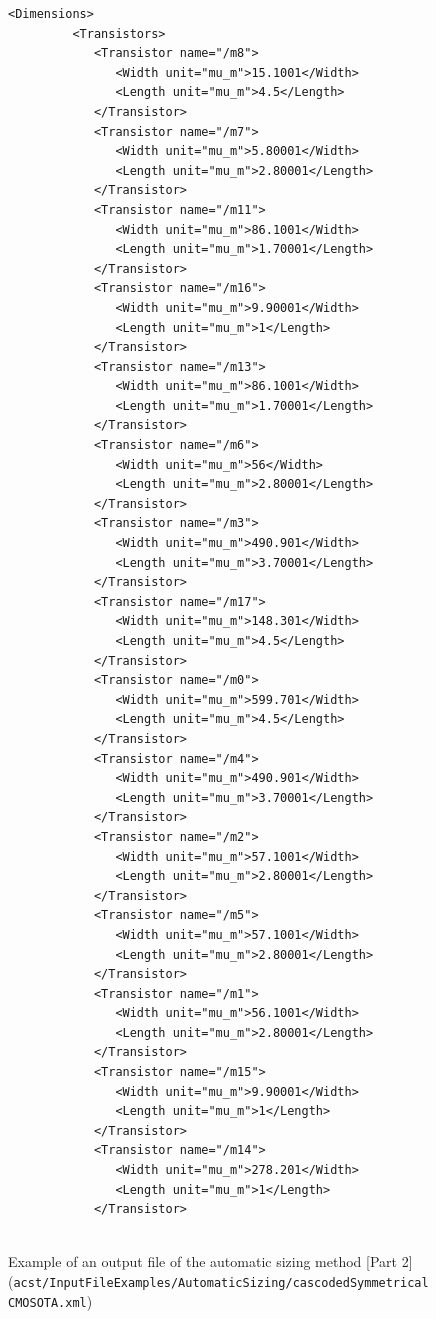 \begin{figure}[H]
	\begin{lstlisting}[basicstyle=\ttfamily\scriptsize,backgroundcolor={\color{gray!30}}, escapechar=? ]
      <Dimensions>
         <Transistors>
            <Transistor name="/m8">
               <Width unit="mu_m">15.1001</Width>
               <Length unit="mu_m">4.5</Length>
            </Transistor>
            <Transistor name="/m7">
               <Width unit="mu_m">5.80001</Width>
               <Length unit="mu_m">2.80001</Length>
            </Transistor>
            <Transistor name="/m11">
               <Width unit="mu_m">86.1001</Width>
               <Length unit="mu_m">1.70001</Length>
            </Transistor>
            <Transistor name="/m16">
               <Width unit="mu_m">9.90001</Width>
               <Length unit="mu_m">1</Length>
            </Transistor>
            <Transistor name="/m13">
               <Width unit="mu_m">86.1001</Width>
               <Length unit="mu_m">1.70001</Length>
            </Transistor>
            <Transistor name="/m6">
               <Width unit="mu_m">56</Width>
               <Length unit="mu_m">2.80001</Length>
            </Transistor>
            <Transistor name="/m3">
               <Width unit="mu_m">490.901</Width>
               <Length unit="mu_m">3.70001</Length>
            </Transistor>
            <Transistor name="/m17">
               <Width unit="mu_m">148.301</Width>
               <Length unit="mu_m">4.5</Length>
            </Transistor>
            <Transistor name="/m0">
               <Width unit="mu_m">599.701</Width>
               <Length unit="mu_m">4.5</Length>
            </Transistor>
            <Transistor name="/m4">
               <Width unit="mu_m">490.901</Width>
               <Length unit="mu_m">3.70001</Length>
            </Transistor>
            <Transistor name="/m2">
               <Width unit="mu_m">57.1001</Width>
               <Length unit="mu_m">2.80001</Length>
            </Transistor>
            <Transistor name="/m5">
               <Width unit="mu_m">57.1001</Width>
               <Length unit="mu_m">2.80001</Length>
            </Transistor>
            <Transistor name="/m1">
               <Width unit="mu_m">56.1001</Width>
               <Length unit="mu_m">2.80001</Length>
            </Transistor>
            <Transistor name="/m15">
               <Width unit="mu_m">9.90001</Width>
               <Length unit="mu_m">1</Length>
            </Transistor>
            <Transistor name="/m14">
               <Width unit="mu_m">278.201</Width>
               <Length unit="mu_m">1</Length>
            </Transistor>
	
	\end{lstlisting}
	\caption{Example of an output file of the automatic sizing method [Part 2] ({\tt acst/\protect \linebreak InputFileExamples/AutomaticSizing/cascodedSymmetricalCMOSOTA.xml})}
\end{figure}

